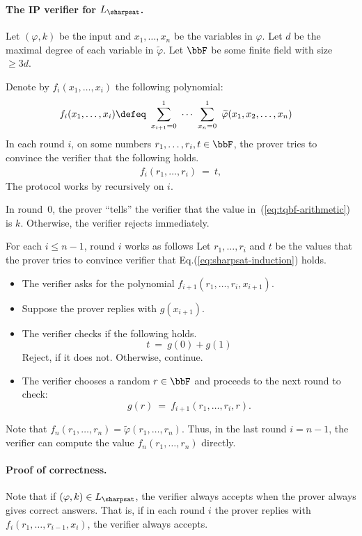 \documentclass[11pt, a4paper]{article}
\begin{document}
\paragraph*{The IP verifier for $L_{\sharpsat}$.}
Let $(\varphi,k)$ be the input and $x_1,\ldots,x_n$ be the variables in $\varphi$.
Let $d$ be the maximal degree of each variable in $\widetilde{\varphi}$.
Let $\bbF$ be some finite field with size $\geq 3d$.

Denote by $f_i(x_1,\ldots,x_i)$ the following polynomial:
\begin{align*}
f_i(x_1,\ldots,x_i) & \defeq\ \sum_{x_{i+1}=0}^1\ \cdots\ \sum_{x_n=0}^1 \ \widetilde{\varphi}(x_1,x_2,\ldots,x_n)
\end{align*}
In each round $i$, on some numbers $r_1,\ldots,r_i,t \in \bbF$,
the prover tries to convince the verifier that the following holds.
\begin{align}
\label{eq:sharpsat-induction}
f_i(r_1,\ldots,r_i) \ = \ t,
\end{align}
The protocol works by recursively on $i$.

In round~0, the prover ``tells'' the verifier that the value in~(\ref{eq:tqbf-arithmetic}) is $k$.
Otherwise, the verifier rejects immediately.

For each $i\leq n-1$, round $i$ works as follows
Let $r_1,\ldots,r_i$ and $t$ be the values that the prover tries to convince
verifier that Eq.(\ref{eq:sharpsat-induction}) holds.
\begin{itemize}
\item 
The verifier asks for the polynomial $f_{i+1}(r_1,\ldots,r_{i},x_{i+1})$.

\item 
Suppose the prover replies with $g(x_{i+1})$.

\item 
The verifier checks if the following holds.
$$
t \ = \ g(0) + g(1)
$$
Reject, if it does not. Otherwise, continue.

\item 
The verifier chooses a random $r\in \bbF$ and proceeds to the next round to check:
$$
g(r) \ = \
f_{i+1}(r_1,\ldots,r_{i},r).
$$
\end{itemize}
Note that $f_{n}(r_1,\ldots,r_n)=\widetilde{\varphi}(r_1,\ldots,r_n)$.
Thus, in the last round $i=n-1$,
the verifier can compute the value $f_{n}(r_1,\ldots,r_n)$ directly.



\paragraph*{Proof of correctness.}
Note that if $(\varphi,k)\in L_{\sharpsat}$, the verifier always accepts
when the prover always gives correct answers.
That is, if in each round $i$ the prover replies with $f_i(r_1,\ldots,r_{i-1},x_i)$,
the verifier always accepts.
\end{document}
